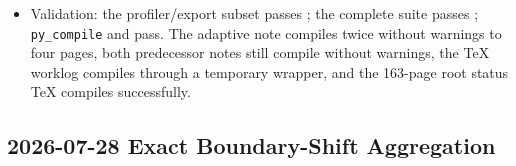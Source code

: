\begin{itemize}
Two one-CPU runs took \(27.53\) and \(27.63\) seconds and were byte-identical.
The SHA256 is
\texttt{}.
The non-aggregation surface artifact also remains byte-identical.
\item Validation: the profiler/export subset passes
\texttt{}; the complete suite passes
\texttt{}; \texttt{py\_compile} and
\texttt{} pass.  The adaptive note compiles
twice without warnings to four pages, both predecessor notes still compile
without warnings, the TeX worklog compiles through a temporary wrapper, and
the 163-page root status TeX compiles successfully.
\end{itemize}

\subsection*{2026-07-28 Exact Boundary-Shift Aggregation}


